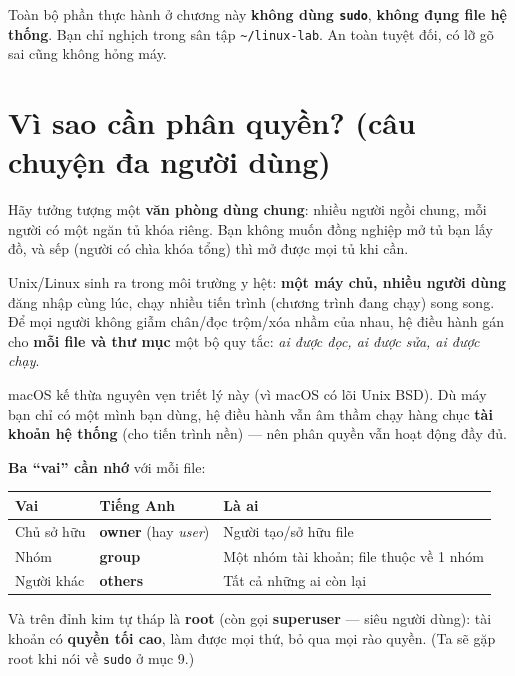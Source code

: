 \documentclass[12pt,a4paper]{article}
\newcommand{\cmd}[1]{\texttt{#1}}
\begin{document}
\begin{notebox}[Trấn an]
Toàn bộ phần thực hành ở chương này \textbf{không dùng \cmd{sudo}}, \textbf{không
đụng file hệ thống}. Bạn chỉ nghịch trong sân tập \cmd{\textasciitilde/linux-lab}.
An toàn tuyệt đối, có lỡ gõ sai cũng không hỏng máy.
\end{notebox}

\section{Vì sao cần phân quyền? (câu chuyện đa người dùng)}

Hãy tưởng tượng một \textbf{văn phòng dùng chung}: nhiều người ngồi chung, mỗi
người có một ngăn tủ khóa riêng. Bạn không muốn đồng nghiệp mở tủ bạn lấy đồ, và
sếp (người có chìa khóa tổng) thì mở được mọi tủ khi cần.

Unix/Linux sinh ra trong môi trường y hệt: \textbf{một máy chủ, nhiều người dùng}
đăng nhập cùng lúc, chạy nhiều tiến trình (chương trình đang chạy) song song. Để
mọi người không giẫm chân/đọc trộm/xóa nhầm của nhau, hệ điều hành gán cho
\textbf{mỗi file và thư mục} một bộ quy tắc: \textit{ai được đọc, ai được sửa, ai
được chạy}.

macOS kế thừa nguyên vẹn triết lý này (vì macOS có lõi Unix BSD). Dù máy bạn chỉ có
một mình bạn dùng, hệ điều hành vẫn âm thầm chạy hàng chục \textbf{tài khoản hệ
thống} (cho tiến trình nền) --- nên phân quyền vẫn hoạt động đầy đủ.

\textbf{Ba ``vai'' cần nhớ} với mỗi file:

\begin{center}
\begin{tabular}{|>{\raggedright\arraybackslash}p{3.2cm}|>{\raggedright\arraybackslash}p{3.8cm}|>{\raggedright\arraybackslash}p{5.5cm}|}
\hline
\rowcolor{tablehead}\textbf{Vai} & \textbf{Tiếng Anh} & \textbf{Là ai} \\
\hline
Chủ sở hữu & \textbf{owner} (hay \textit{user}) & Người tạo/sở hữu file \\
\hline
Nhóm & \textbf{group} & Một nhóm tài khoản; file thuộc về 1 nhóm \\
\hline
Người khác & \textbf{others} & Tất cả những ai còn lại \\
\hline
\end{tabular}
\end{center}

Và trên đỉnh kim tự tháp là \textbf{root} (còn gọi \textbf{superuser} --- siêu người
dùng): tài khoản có \textbf{quyền tối cao}, làm được mọi thứ, bỏ qua mọi rào quyền.
(Ta sẽ gặp root khi nói về \cmd{sudo} ở mục 9.)
\end{document}
